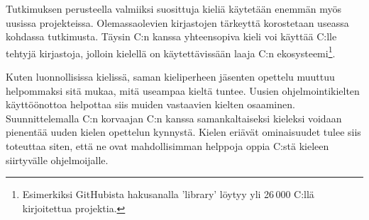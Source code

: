 Tutkimuksen perusteella valmiiksi suosittuja kieliä käytetään enemmän myös
uusissa projekteissa. Olemassaolevien kirjastojen tärkeyttä korostetaan
useassa kohdassa tutkimusta. Täysin C:n kanssa yhteensopiva kieli voi käyttää
C:lle tehtyjä kirjastoja, jolloin kielellä on käytettävissään laaja C:n
ekosysteemi\footnote{Esimerkiksi GitHubista hakusanalla 'library' löytyy yli
26\,000 C:llä kirjoitettua projektia.}.

Kuten luonnollisissa kielissä, saman kieliperheen jäsenten opettelu muuttuu
helpommaksi sitä mukaa, mitä useampaa kieltä tuntee\citationneeded. Uusien
ohjelmointikielten käyttöönottoa helpottaa siis muiden vastaavien kielten
osaaminen. Suunnittelemalla C:n korvaajan C:n kanssa samankaltaiseksi kieleksi
voidaan pienentää uuden kielen opettelun kynnystä. Kielen eriävät ominaisuudet
tulee siis toteuttaa siten, että ne ovat mahdollisimman helppoja oppia C:stä
kieleen siirtyvälle ohjelmoijalle.


%
%
%
%

